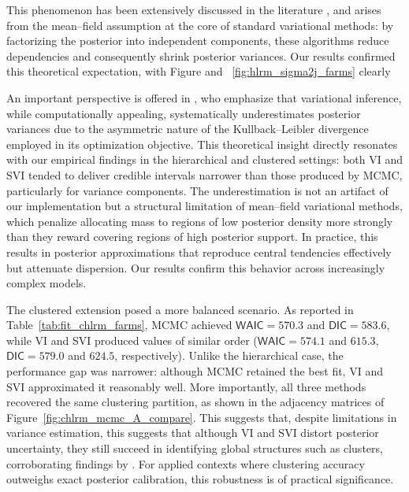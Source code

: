 \vspace{0.3cm}

This phenomenon has been extensively discussed in the literature \cite{Blei2006-kd, Wainwright2007-ul, wang22g}, and arises from the mean--field assumption at the core of standard variational methods: by factorizing the posterior into independent components, these algorithms reduce dependencies and consequently shrink posterior variances. Our results confirmed this theoretical expectation, with Figure and ~\ref{fig:hlrm_sigma2j_farms} clearly 

\vspace{0.3cm}

An important perspective is offered in \cite{Blei2016VariationalIA}, who emphasize that variational inference, while computationally appealing, systematically underestimates posterior variances due to the asymmetric nature of the Kullback--Leibler divergence employed in its optimization objective. This theoretical insight directly resonates with our empirical findings in the hierarchical and clustered settings: both VI and SVI tended to deliver credible intervals narrower than those produced by MCMC, particularly for variance components. The underestimation is not an artifact of our implementation but a structural limitation of mean--field variational methods, which penalize allocating mass to regions of low posterior density more strongly than they reward covering regions of high posterior support. In practice, this results in posterior approximations that reproduce central tendencies effectively but attenuate dispersion. Our results confirm this behavior across increasingly complex models. 

\vspace{0.3cm}

The clustered extension posed a more balanced scenario. As reported in Table~\ref{tab:fit_chlrm_farms}, MCMC achieved $\mathsf{WAIC}=570.3$ and $\mathsf{DIC}=583.6$, while VI and SVI produced values of similar order ($\mathsf{WAIC}=574.1$ and $615.3$, $\mathsf{DIC}=579.0$ and $624.5$, respectively). Unlike the hierarchical case, the performance gap was narrower: although MCMC retained the best fit, VI and SVI approximated it reasonably well. More importantly, all three methods recovered the same clustering partition, as shown in the adjacency matrices of Figure~\ref{fig:chlrm_mcmc_A_compare}. This suggests that, despite limitations in variance estimation, this suggests that although VI and SVI distort posterior uncertainty, they still succeed in identifying global structures such as clusters, corroborating findings by \cite{Blei2006-kd, HOFFMAN,beal2003variational}. For applied contexts where clustering accuracy outweighs exact posterior calibration, this robustness is of practical significance.

